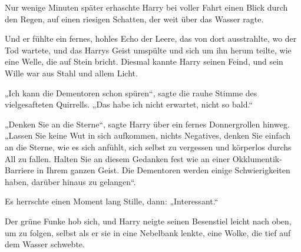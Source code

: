 Nur wenige Minuten später erhaschte Harry bei voller Fahrt einen Blick durch den Regen, auf einen riesigen Schatten, der weit über das Wasser ragte.

Und er fühlte ein fernes, hohles Echo der Leere, das von dort ausstrahlte, wo der Tod wartete, und das Harrys Geist umspülte und sich um ihn herum teilte, wie eine Welle, die auf Stein bricht. Diesmal kannte Harry seinen Feind, und sein Wille war aus Stahl und allem Licht.

„Ich kann die Dementoren schon spüren“, sagte die rauhe Stimme des vielgesafteten Quirrells. „Das habe ich nicht erwartet, nicht so bald.“

„Denken Sie an die Sterne“, sagte Harry über ein fernes Donnergrollen hinweg. „Lassen Sie keine Wut in sich aufkommen, nichts Negatives, denken Sie einfach an die Sterne, wie es sich anfühlt, sich selbst zu vergessen und körperlos durchs All zu fallen. Halten Sie an diesem Gedanken fest wie an einer Okklumentik-Barriere in Ihrem ganzen Geist. Die Dementoren werden einige Schwierigkeiten haben, darüber hinaus zu gelangen“.

Es herrschte einen Moment lang Stille, dann: „Interessant.“

Der grüne Funke hob sich, und Harry neigte seinen Besenstiel leicht nach oben, um zu folgen, selbst als er sie in eine Nebelbank lenkte, eine Wolke, die tief auf dem Wasser schwebte.

